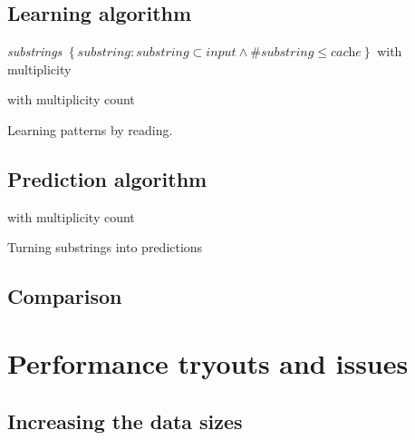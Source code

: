 \documentclass[a4paper,12pt]{article}
\begin{document}

  \subsection{Learning algorithm}

  \begin{algorithm}

    \textit{substrings} \gets{}
      $\left\{ \textit{substring} : \textit{substring}\subset\textit{input}
      \wedge \#\textit{substring} \leq \textit{cache} \right\}$
      with multiplicity\;

     with multiplicity count\;

    \caption{\label{learning}Learning patterns by reading.}
  \end{algorithm}

  \subsection{Prediction algorithm}

  \begin{algorithm}



     with multiplicity count\;

    \caption{\label{predicting}Turning substrings into predictions}
  \end{algorithm}

  \subsection{Comparison}


  \section{Performance tryouts and issues}\label{tests}

  \subsection{Increasing the data sizes}
\end{document}

